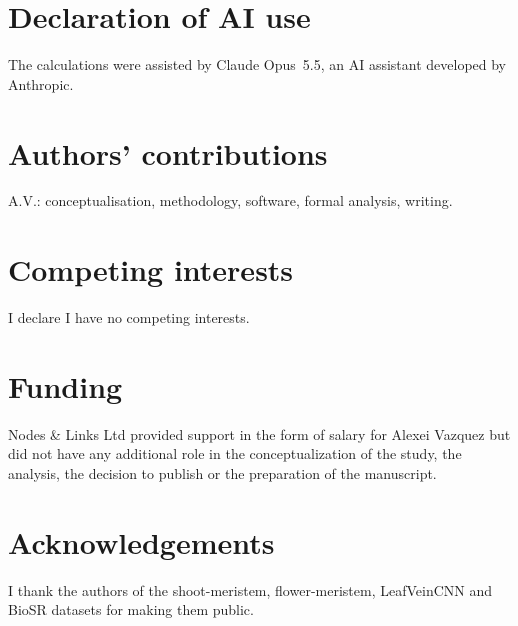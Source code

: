 \documentclass[11pt,a4paper]{article}
\begin{document}
\section*{Declaration of AI use}
The calculations were assisted by Claude Opus~5.5, an AI assistant developed by Anthropic.

\section*{Authors' contributions}
A.V.: conceptualisation, methodology, software, formal analysis, writing.

\section*{Competing interests}
I declare I have no competing interests.

\section*{Funding}
Nodes \& Links Ltd provided support in the form of salary for Alexei Vazquez but did not have
any additional role in the conceptualization of the study, the analysis, the decision to
publish or the preparation of the manuscript.

\section*{Acknowledgements}
I thank the authors of the shoot-meristem, flower-meristem, LeafVeinCNN and BioSR datasets
for making them public.



\end{document}

